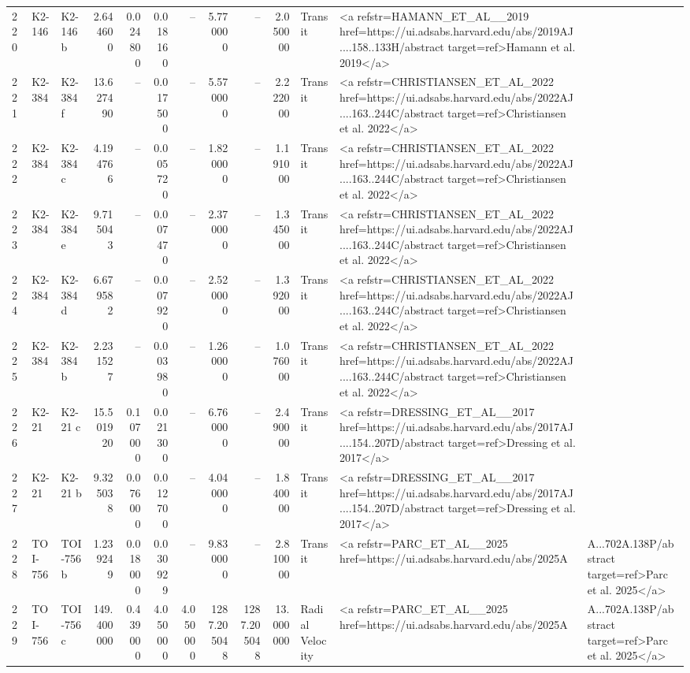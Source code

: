 \begin{tabular}{lllrrrrrrrll}
220 & K2-146 & K2-146 b & 2.644600 & 0.024800 & 0.018160 & -- & 5.770000 & -- & 2.050000 & Transit & <a refstr=HAMANN_ET_AL__2019 href=https://ui.adsabs.harvard.edu/abs/2019AJ....158..133H/abstract target=ref>Hamann et al. 2019</a> \\
221 & K2-384 & K2-384 f & 13.627490 & -- & 0.017500 & -- & 5.570000 & -- & 2.222000 & Transit & <a refstr=CHRISTIANSEN_ET_AL_2022 href=https://ui.adsabs.harvard.edu/abs/2022AJ....163..244C/abstract target=ref>Christiansen et al. 2022</a> \\
222 & K2-384 & K2-384 c & 4.194766 & -- & 0.005720 & -- & 1.820000 & -- & 1.191000 & Transit & <a refstr=CHRISTIANSEN_ET_AL_2022 href=https://ui.adsabs.harvard.edu/abs/2022AJ....163..244C/abstract target=ref>Christiansen et al. 2022</a> \\
223 & K2-384 & K2-384 e & 9.715043 & -- & 0.007470 & -- & 2.370000 & -- & 1.345000 & Transit & <a refstr=CHRISTIANSEN_ET_AL_2022 href=https://ui.adsabs.harvard.edu/abs/2022AJ....163..244C/abstract target=ref>Christiansen et al. 2022</a> \\
224 & K2-384 & K2-384 d & 6.679582 & -- & 0.007920 & -- & 2.520000 & -- & 1.392000 & Transit & <a refstr=CHRISTIANSEN_ET_AL_2022 href=https://ui.adsabs.harvard.edu/abs/2022AJ....163..244C/abstract target=ref>Christiansen et al. 2022</a> \\
225 & K2-384 & K2-384 b & 2.231527 & -- & 0.003980 & -- & 1.260000 & -- & 1.076000 & Transit & <a refstr=CHRISTIANSEN_ET_AL_2022 href=https://ui.adsabs.harvard.edu/abs/2022AJ....163..244C/abstract target=ref>Christiansen et al. 2022</a> \\
226 & K2-21 & K2-21 c & 15.501920 & 0.107000 & 0.021300 & -- & 6.760000 & -- & 2.490000 & Transit & <a refstr=DRESSING_ET_AL__2017 href=https://ui.adsabs.harvard.edu/abs/2017AJ....154..207D/abstract target=ref>Dressing et al. 2017</a> \\
227 & K2-21 & K2-21 b & 9.325038 & 0.076000 & 0.012700 & -- & 4.040000 & -- & 1.840000 & Transit & <a refstr=DRESSING_ET_AL__2017 href=https://ui.adsabs.harvard.edu/abs/2017AJ....154..207D/abstract target=ref>Dressing et al. 2017</a> \\
228 & TOI-756 & TOI-756 b & 1.239249 & 0.018000 & 0.030929 & -- & 9.830000 & -- & 2.810000 & Transit & <a refstr=PARC_ET_AL__2025 href=https://ui.adsabs.harvard.edu/abs/2025A&A...702A.138P/abstract target=ref>Parc et al. 2025</a> \\
229 & TOI-756 & TOI-756 c & 149.400000 & 0.439000 & 4.050000 & 4.050000 & 1287.205048 & 1287.205048 & 13.000000 & Radial Velocity & <a refstr=PARC_ET_AL__2025 href=https://ui.adsabs.harvard.edu/abs/2025A&A...702A.138P/abstract target=ref>Parc et al. 2025</a> \\

\end{tabular}
